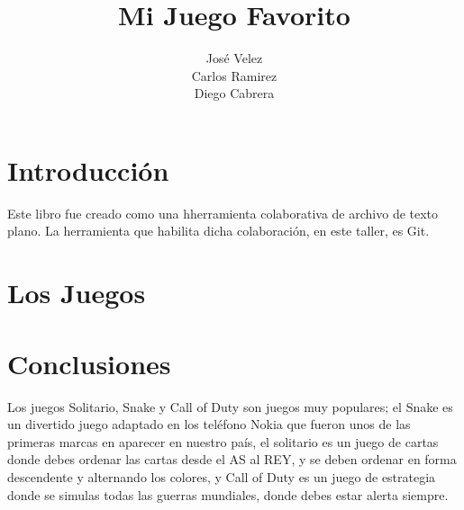 \documentclass[12pt,oneside]{book}
\title{Mi Juego Favorito}
\author{José Velez
\\Carlos Ramirez
\\Diego Cabrera}
\begin{document}
\maketitle
\tableofcontents

\chapter{Introducción}
Este libro fue creado como una hherramienta colaborativa de archivo de texto plano. La herramienta que habilita dicha colaboración, en este taller, es Git.

\chapter{Los Juegos}





\chapter{Conclusiones}
Los juegos Solitario, Snake y Call of Duty son juegos muy populares; el Snake es un divertido juego adaptado en los teléfono Nokia que fueron unos de las primeras marcas en aparecer en nuestro país, el solitario es un juego de cartas donde debes ordenar las cartas desde el AS al REY, y se deben ordenar en forma descendente y alternando los colores, y Call of Duty es un juego de estrategia donde se simulas todas las guerras mundiales, donde debes estar alerta siempre.
\end{document}
